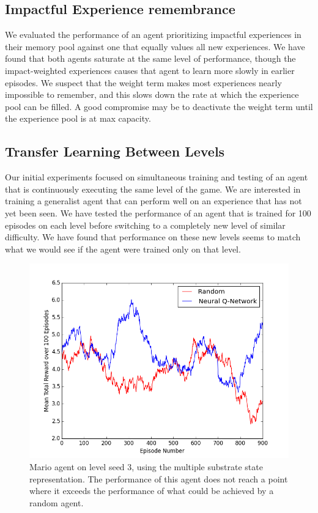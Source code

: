 \documentclass{article}
\begin{document}
 \subsection{Impactful Experience remembrance}
 We evaluated the performance of an agent prioritizing impactful experiences in their memory pool against one that equally values all new experiences. We have found that both agents saturate at the same level of performance, though the impact-weighted experiences causes that agent to learn more slowly in earlier episodes. We suspect that the weight term makes most experiences nearly impossible to remember, and this slows down the rate at which the experience pool can be filled. A good compromise may be to deactivate the weight term until the experience pool is at max capacity.
 
 \subsection{Transfer Learning Between Levels}
 
 Our initial experiments focused on simultaneous training and testing of an agent that is continuously executing the same level of the game. We are interested in training a generalist agent that can perform well on an experience that has not yet been seen. We have tested the performance of an agent that is trained for 100 episodes on each level before switching to a completely new level of similar difficulty. We have found that performance on these new levels seems to match what we would see if the agent were trained only on that level.
 
  \begin{figure}
 \begin{center}
\includegraphics[scale=0.42]{seed3wSubstrates.png}
\caption{Mario agent on level seed 3, using the multiple substrate state representation. The performance of this agent does not reach a point where it exceeds the performance of what could be achieved by a random agent.}
\end{center}
\end{figure}
 
\end{document}
